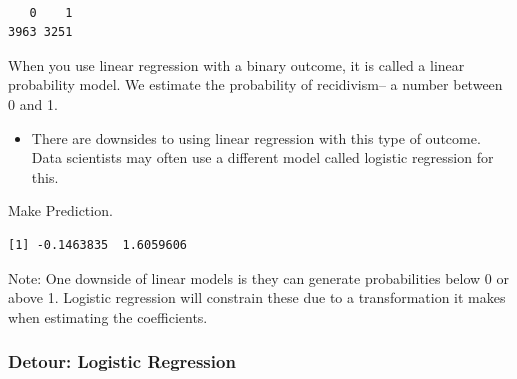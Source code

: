 \documentclass[
  letterpaper,
  DIV=11,
  numbers=noendperiod]{scrreprt}
\newenvironment{Shaded}{\begin{snugshade}}{\end{snugshade}}
\newcommand{\DocumentationTok}[1]{\textcolor[rgb]{0.37,0.37,0.37}{\textit{#1}}}
\newcommand{\FunctionTok}[1]{\textcolor[rgb]{0.28,0.35,0.67}{#1}}
\newcommand{\NormalTok}[1]{\textcolor[rgb]{0.00,0.23,0.31}{#1}}
\newcommand{\OtherTok}[1]{\textcolor[rgb]{0.00,0.23,0.31}{#1}}
\newcommand{\SpecialCharTok}[1]{\textcolor[rgb]{0.37,0.37,0.37}{#1}}
\providecommand{\tightlist}{%
  \setlength{\itemsep}{0pt}\setlength{\parskip}{0pt}}\usepackage{longtable,booktabs,array}
\begin{document}
\begin{Shaded}
\end{Shaded}

\begin{verbatim}

   0    1 
3963 3251 
\end{verbatim}

When you use linear regression with a binary outcome, it is called a
linear probability model. We estimate the probability of recidivism-- a
number between 0 and 1.

\begin{itemize}
\tightlist
\item
  There are downsides to using linear regression with this type of
  outcome. Data scientists may often use a different model called
  logistic regression for this.
\end{itemize}

Make Prediction.

\begin{Shaded}
\end{Shaded}

\begin{verbatim}
[1] -0.1463835  1.6059606
\end{verbatim}

Note: One downside of linear models is they can generate probabilities
below 0 or above 1. Logistic regression will constrain these due to a
transformation it makes when estimating the coefficients.

\hypertarget{detour-logistic-regression}{%
\subsubsection{Detour: Logistic
Regression}\label{detour-logistic-regression}}
\end{document}

